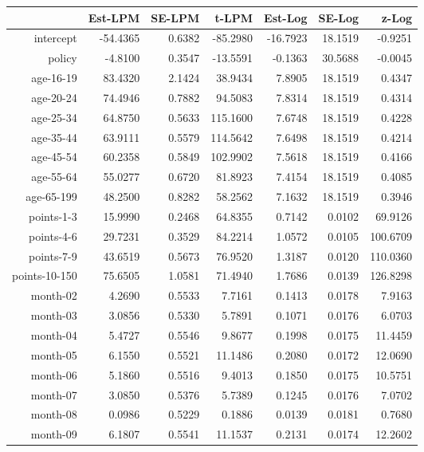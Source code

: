 \documentclass[10pt]{article}
\begin{document}
\begin{table}[ht]
\centering
\begin{tabular}{rrrrrrr}
  \hline
 & Est-LPM & SE-LPM & t-LPM & Est-Log & SE-Log & z-Log \\ 
  \hline
intercept & -54.4365 & 0.6382 & -85.2980 & -16.7923 & 18.1519 & -0.9251 \\ 
  policy & -4.8100 & 0.3547 & -13.5591 & -0.1363 & 30.5688 & -0.0045 \\ 
  age-16-19 & 83.4320 & 2.1424 & 38.9434 & 7.8905 & 18.1519 & 0.4347 \\ 
  age-20-24 & 74.4946 & 0.7882 & 94.5083 & 7.8314 & 18.1519 & 0.4314 \\ 
  age-25-34 & 64.8750 & 0.5633 & 115.1600 & 7.6748 & 18.1519 & 0.4228 \\ 
  age-35-44 & 63.9111 & 0.5579 & 114.5642 & 7.6498 & 18.1519 & 0.4214 \\ 
  age-45-54 & 60.2358 & 0.5849 & 102.9902 & 7.5618 & 18.1519 & 0.4166 \\ 
  age-55-64 & 55.0277 & 0.6720 & 81.8923 & 7.4154 & 18.1519 & 0.4085 \\ 
  age-65-199 & 48.2500 & 0.8282 & 58.2562 & 7.1632 & 18.1519 & 0.3946 \\ 
  points-1-3 & 15.9990 & 0.2468 & 64.8355 & 0.7142 & 0.0102 & 69.9126 \\ 
  points-4-6 & 29.7231 & 0.3529 & 84.2214 & 1.0572 & 0.0105 & 100.6709 \\ 
  points-7-9 & 43.6519 & 0.5673 & 76.9520 & 1.3187 & 0.0120 & 110.0360 \\ 
  points-10-150 & 75.6505 & 1.0581 & 71.4940 & 1.7686 & 0.0139 & 126.8298 \\ 
  month-02 & 4.2690 & 0.5533 & 7.7161 & 0.1413 & 0.0178 & 7.9163 \\ 
  month-03 & 3.0856 & 0.5330 & 5.7891 & 0.1071 & 0.0176 & 6.0703 \\ 
  month-04 & 5.4727 & 0.5546 & 9.8677 & 0.1998 & 0.0175 & 11.4459 \\ 
  month-05 & 6.1550 & 0.5521 & 11.1486 & 0.2080 & 0.0172 & 12.0690 \\ 
  month-06 & 5.1860 & 0.5516 & 9.4013 & 0.1850 & 0.0175 & 10.5751 \\ 
  month-07 & 3.0850 & 0.5376 & 5.7389 & 0.1245 & 0.0176 & 7.0702 \\ 
  month-08 & 0.0986 & 0.5229 & 0.1886 & 0.0139 & 0.0181 & 0.7680 \\ 
  month-09 & 6.1807 & 0.5541 & 11.1537 & 0.2131 & 0.0174 & 12.2602 \\ 

\end{tabular}
\end{table}
\end{document}
